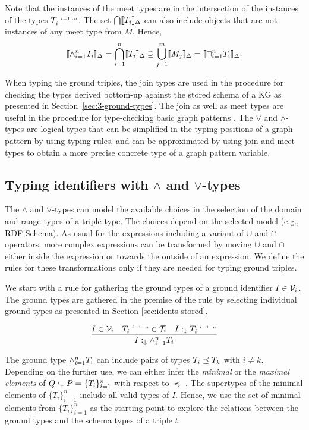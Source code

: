 \documentclass[runningheads]{llncs}
\newcommand{\s}{\scriptscriptstyle\ \,}
\newcommand{\darr}{\downarrow}
\newcommand{\llb}{\llbracket}
\newcommand{\rrb}{\rrbracket}
\newcommand{\V}{{\cal V}}
\newcommand{\T}{{\cal T}}
\begin{document}
Note that the instances of the meet types are in the intersection of
the instances of the types $T_i^{\s\/i=1..n}$. The set
$\bigcap\/\llb\/T_i\rrb_\D$ can also include objects that are not
instances of any meet type from $M$. Hence,
$$\llb\land_{i=1}^n\/T_i\rrb_\D=\bigcap_{i=1}^n\llb\/T_i\rrb_\D\supseteq\bigcup_{j=1}^m\llb\/M_j\rrb_\D=\llb\sqcap_{i=1}^n\/T_i\rrb_\D.$$

When typing the ground triples, the join types are used in the
procedure for checking the types derived bottom-up against the stored
schema of a KG as presented in Section~\ref{sec:3-ground-types}. The
join as well as meet types are useful in the procedure for
type-checking basic graph patterns \cite{Savnik2025a}. The $\lor$ and
$\land$-types are logical types that can be simplified in the typing
positions of a graph pattern by using typing rules, and can be
approximated by using join and meet types to obtain a more precise
concrete type of a graph pattern variable.




\subsection{Typing identifiers with $\land$ and $\lor$-types}

The $\land$ and $\lor$-types can model the available choices in the
selection of the domain and range types of a triple type. The choices
depend on the selected model (e.g., RDF-Schema). As usual for the
expressions including a variant of $\cup$ and $\cap$ operators, more
complex expressions can be transformed by moving $\cup$ and $\cap$
either inside the expression or towards the outside of an
expression. We define the rules for these transformations only if they
are needed for typing ground triples.

We start with a rule for gathering the ground types of a ground
identifier $I\in\V_i$. The ground types are gathered in the premise of
the rule by selecting individual ground types as presented in Section
\ref{sec:idents-stored}.

\begin{equation}
\label{rul:land-1}
\dfrac{I\in\V_i\quad\/T_i^{\s\/i=1..n}\in\T_i\quad\/I:_{\darr}T_i^{\s\/i=1..n}}
      {I:_{\darr}\land_{i=1}^n\/T_i}
\end{equation}

The ground type $\land_{i=1}^n\/T_i$ can include pairs of types
$T_i\preceq\/T_k$ with $i\not=k$. Depending on the further use, we can
either infer the \emph{minimal} or the \emph{maximal elements} of
$Q\subseteq\/P=\{T_i\}_{i=1}^n$ with respect to $\preceq$
\cite{DaveyPriestley2002}. The supertypes of the minimal elements of
$\{T_i\}_{i=1}^n$ include all valid types of $I$. Hence, we use the
set of minimal elements from $\{T_i\}_{i=1}^n$ as the starting point
to explore the relations between the ground types and the schema types
of a triple $t$.
\end{document}
